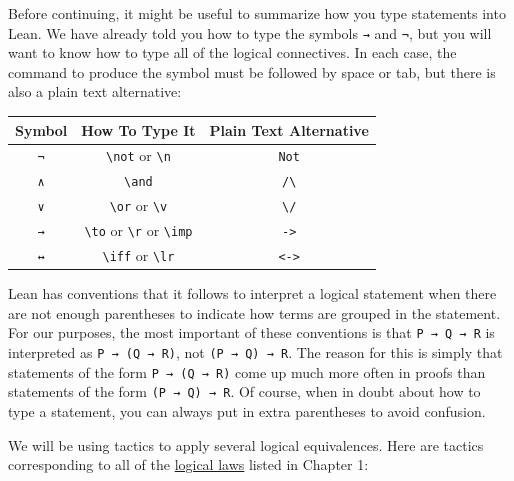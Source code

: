 \documentclass[
  letterpaper,
  DIV=11,
  numbers=noendperiod]{scrreprt}
\newcommand{\excl}[1]{}
\theoremstyle{remark}
\begin{document}
Before continuing, it might be useful to summarize how you type
statements into Lean. We have already told you how to type the symbols
\texttt{→} and \texttt{¬}, but you will want to know how to type all of
the logical connectives. In each case, the command to produce the symbol
must be followed by space or tab, but there is also a plain text
alternative:

\begin{longtable}[]{@{}ccc@{}}
\toprule()
Symbol & How To Type It & Plain Text Alternative \\
\midrule()
\endhead
\texttt{¬} & \texttt{\textbackslash{}not} or \texttt{\textbackslash{}n}
& \texttt{Not} \\
\texttt{∧} & \texttt{\textbackslash{}and} &
\texttt{/\textbackslash{}} \\
\texttt{∨} & \texttt{\textbackslash{}or} or \texttt{\textbackslash{}v} &
\texttt{\textbackslash{}/} \\
\texttt{→} & \texttt{\textbackslash{}to} or \texttt{\textbackslash{}r}
or \texttt{\textbackslash{}imp} &
\excl{\texttt{-\textgreater{}}}\texttt{-\null>} \\
\texttt{↔} & \texttt{\textbackslash{}iff} or \texttt{\textbackslash{}lr}
& \excl{\texttt{\textless{}-\textgreater{}}}\texttt{<-\null>} \\
\bottomrule()
\end{longtable}

Lean has conventions that it follows to interpret a logical statement
when there are not enough parentheses to indicate how terms are grouped
in the statement. For our purposes, the most important of these
conventions is that \texttt{P\ →\ Q\ →\ R} is interpreted as
\texttt{P\ →\ (Q\ →\ R)}, not \texttt{(P\ →\ Q)\ →\ R}. The reason for
this is simply that statements of the form \texttt{P\ →\ (Q\ →\ R)} come
up much more often in proofs than statements of the form
\texttt{(P\ →\ Q)\ →\ R}. Of course, when in doubt about how to type a
statement, you can always put in extra parentheses to avoid confusion.

We will be using tactics to apply several logical equivalences. Here are
tactics corresponding to all of the
\protect\hyperlink{prop-laws}{logical laws} listed in Chapter 1:
\end{document}
